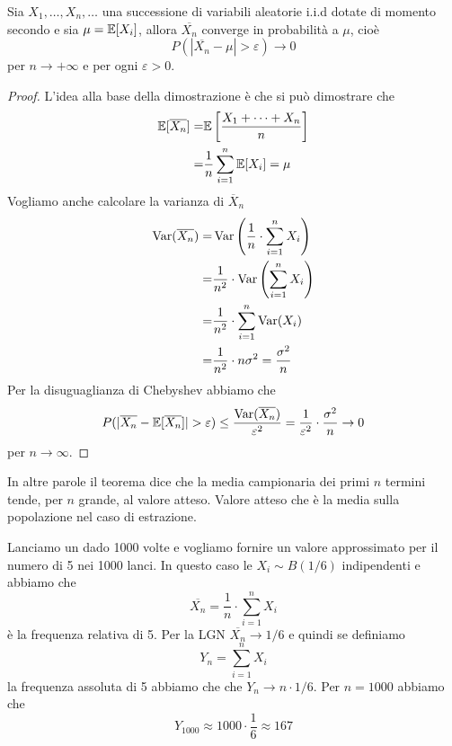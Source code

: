 \begin{theorem}
	Sia $X_1, \dots, X_n, \dots$ una successione di variabili aleatorie i.i.d dotate di momento
	secondo e sia $\mu = \mathbb{E}[X_i]$, allora $\overline{X_n}$ converge in probabilità a $\mu$, cioè
	\[ P(|\overline{X_n} - \mu| > \varepsilon) \to 0 \]
	per $n \to +\infty$ e per ogni $\varepsilon > 0$.
	\begin{proof}
		L'idea alla base della dimostrazione è che si può dimostrare che
		\begin{align*}
			\mathbb{E}[\overline{X_n}] = & \mathbb{E}\left[ \frac{X_1 + \dots + X_n}{n} \right] \\
			=                    & \frac{1}{n} \sum_{i=1}^n \mathbb{E}[X_i] = \mu
		\end{align*}
		Vogliamo anche calcolare la varianza di $\overline{X}_n$
		\begin{align*}
			\operatorname{Var}(\overline{X_n}) = & \operatorname{Var} \left( \frac{1}{n} \cdot \sum_{i=1}^n X_i \right)   \\
			=                      & \frac{1}{n^2} \cdot \operatorname{Var} \left( \sum_{i=1}^n X_i \right) \\
			=                      & \frac{1}{n^2} \cdot \sum_{i=1}^n \operatorname{Var}(X_i)               \\
			=                      & \frac{1}{n^2} \cdot n \sigma^2 = \frac{\sigma^2}{n}
		\end{align*}
		Per la disuguaglianza di Chebyshev abbiamo che
		\[
			P(|\overline{X_n} - \mathbb{E}[\overline{X_n}]| >
			\varepsilon) \leq \frac{\operatorname{Var}(\overline{X_n})}{\varepsilon^2} =
			\frac{1}{\varepsilon^2} \cdot \frac{\sigma^2}{n} \to 0
		\]
		per $n \to \infty$.
	\end{proof}
\end{theorem}

In altre parole il teorema dice che la media campionaria dei primi $n$ termini tende, per $n$
grande, al valore atteso. Valore atteso che è la media sulla popolazione nel caso di estrazione.

\begin{example}
	Lanciamo un dado 1000 volte e vogliamo fornire un valore approssimato per il numero di 5 nei
	1000 lanci. In questo caso le $X_i \sim B(1/6)$ indipendenti e abbiamo che
	\[ \overline{X_n} = \frac{1}{n} \cdot \sum_{i=1}^{n} X_i \]
	è la frequenza relativa di 5. Per la LGN $\overline{X_n} \to 1/6$ e quindi se definiamo
	\[ Y_n = \sum_{i=1}^{n} X_i \]
	la frequenza assoluta di 5 abbiamo che che $Y_n \to n \cdot 1/6$. Per $n=1000$ abbiamo che
	\[ Y_{1000} \approx 1000 \cdot \frac{1}{6} \approx 167 \]
\end{example}

